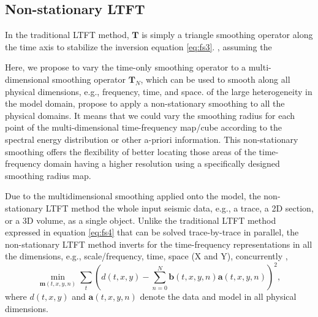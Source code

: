 \subsection{Non-stationary LTFT}
In the traditional LTFT method, $\mathbf{T}$ is simply a triangle smoothing operator along the time axis to stabilize the inversion  equation \ref{eq:fs3}. , assuming the  

Here, we propose to vary the time-only smoothing operator to a multi-dimensional  smoothing operator $\mathbf{T}_N$, which can be used to smooth along all physical dimensions, e.g., frequency, time, and space.  of the large heterogeneity in the model domain,  propose to apply a non-stationary smoothing to all the physical domains. It means that we could vary the smoothing radius for each point of the multi-dimensional time-frequency map/cube according to the spectral energy distribution or other a-priori information. This non-stationary smoothing offers the flexibility of better locating those areas of the time-frequency domain having a higher resolution using a specifically designed smoothing radius map.  

Due to the multidimensional smoothing applied onto the model, the non-stationary LTFT method  the whole input seismic data, e.g., a trace, a 2D section, or a 3D volume, as a single object. Unlike the traditional LTFT method expressed in equation \ref{eq:fs4} that can be solved trace-by-trace in parallel, the non-stationary LTFT method inverts for the time-frequency representations in all the dimensions, e.g., scale/frequency, time, space (X and Y), concurrently ,
\begin{equation}
\label{eq:fs5}
\min_{\mathbf{m}(t,x,y,n)} \sum_{t} \left( d(t,x,y) - \sum_{n=0}^{N} \mathbf{b}(t,x,y,n)\mathbf{a}(t,x,y,n) \right)^2,
\end{equation}
where $d(t,x,y)$ and $\mathbf{a}(t,x,y,n)$ denote the data and model in all physical dimensions. 

